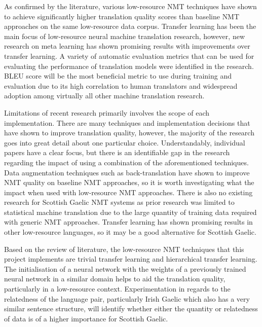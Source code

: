 As confirmed by the literature, various low-resource \acrshort{NMT} techniques have shown to achieve significantly higher translation quality scores than baseline \acrshort{NMT} approaches on the same low-resource data corpus. Transfer learning has been the main focus of low-resource neural machine translation research, however, new research on meta learning has shown promising results with improvements over transfer learning. A variety of automatic evaluation metrics that can be used for evaluating the performance of translation models were identified in the research. \acrshort{BLEU} score will be the most beneficial metric to use during training and evaluation due to its high correlation to human translators and widespread adoption among virtually all other machine translation research.

Limitations of recent research primarily involves the scope of each implementation. There are many techniques and implementation decisions that have shown to improve translation quality, however, the majority of the research goes into great detail about one particular choice. Understandably, individual papers have a clear focus, but there is an identifiable gap in the research regarding the impact of using a combination of the aforementioned techniques. Data augmentation techniques such as back-translation have shown to improve \acrshort{NMT} quality on baseline \acrshort{NMT} approaches, so it is worth investigating what the impact when used with low-resource \acrshort{NMT} approaches. There is also no existing research for Scottish Gaelic \acrshort{NMT} systems as prior research was limited to statistical machine translation due to the large quantity of training data required with generic \acrshort{NMT} approaches. Transfer learning has shown promising results in other low-resource languages, so it may be a good alternative for Scottish Gaelic.

Based on the review of literature, the low-resource \acrshort{NMT} techniques that this project implements are trivial transfer learning and hierarchical transfer learning. The initialisation of a neural network with the weights of a previously trained neural network in a similar domain helps to aid the translation quality, particularly in a low-resource context. Experimentation in regards to the relatedness of the language pair, particularly Irish Gaelic which also has a very similar sentence structure, will identify whether either the quantity or relatedness of data is of a higher importance for Scottish Gaelic.
